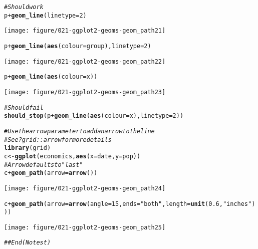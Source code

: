 \documentclass[a4paper,titlepage]{tufte-handout}\usepackage[]{graphicx}\usepackage[]{color}
\makeatletter
\def\maxwidth{ %
  \ifdim\Gin@nat@width>\linewidth
    \linewidth
  \else
    \Gin@nat@width
  \fi
}
\newcommand{\hlnum}[1]{\textcolor[rgb]{0.686,0.059,0.569}{#1}}%
\newcommand{\hlstr}[1]{\textcolor[rgb]{0.192,0.494,0.8}{#1}}%
\newcommand{\hlcom}[1]{\textcolor[rgb]{0.678,0.584,0.686}{\textit{#1}}}%
\newcommand{\hlopt}[1]{\textcolor[rgb]{0,0,0}{#1}}%
\newcommand{\hlstd}[1]{\textcolor[rgb]{0.345,0.345,0.345}{#1}}%
\newcommand{\hlkwb}[1]{\textcolor[rgb]{0.69,0.353,0.396}{#1}}%
\newcommand{\hlkwc}[1]{\textcolor[rgb]{0.333,0.667,0.333}{#1}}%
\newcommand{\hlkwd}[1]{\textcolor[rgb]{0.737,0.353,0.396}{\textbf{#1}}}%
\newenvironment{kframe}{%
 \def\at@end@of@kframe{}%
 \ifinner\ifhmode%
  \def\at@end@of@kframe{\end{minipage}}%
  \begin{minipage}{\columnwidth}%
 \fi\fi%
 \def\FrameCommand##1{\hskip\@totalleftmargin \hskip-\fboxsep
 \colorbox{shadecolor}{##1}\hskip-\fboxsep
     \hskip-\linewidth \hskip-\@totalleftmargin \hskip\columnwidth}%
 \MakeFramed {\advance\hsize-\width
   \@totalleftmargin\z@ \linewidth\hsize
   \@setminipage}}%
 {\par\unskip\endMakeFramed%
 \at@end@of@kframe}
\newenvironment{knitrout}{}{} %
\makeatother
\begin{document}
\begin{knitrout}
\begin{kframe}
\begin{alltt}
\hlcom{# Should work}
\hlstd{p} \hlopt{+} \hlkwd{geom_line}\hlstd{(}\hlkwc{linetype} \hlstd{=} \hlnum{2}\hlstd{)}
\end{alltt}
\end{kframe}
\texttt{[image: figure/021-ggplot2-geoms-geom\_path21]} 
\begin{kframe}\begin{alltt}
\hlstd{p} \hlopt{+} \hlkwd{geom_line}\hlstd{(}\hlkwd{aes}\hlstd{(}\hlkwc{colour} \hlstd{= group),} \hlkwc{linetype} \hlstd{=} \hlnum{2}\hlstd{)}
\end{alltt}
\end{kframe}
\texttt{[image: figure/021-ggplot2-geoms-geom\_path22]} 
\begin{kframe}\begin{alltt}
\hlstd{p} \hlopt{+} \hlkwd{geom_line}\hlstd{(}\hlkwd{aes}\hlstd{(}\hlkwc{colour} \hlstd{= x))}
\end{alltt}
\end{kframe}
\texttt{[image: figure/021-ggplot2-geoms-geom\_path23]} 
\begin{kframe}\begin{alltt}
\hlcom{# Should fail}
\hlkwd{should_stop}\hlstd{(p} \hlopt{+} \hlkwd{geom_line}\hlstd{(}\hlkwd{aes}\hlstd{(}\hlkwc{colour} \hlstd{= x),} \hlkwc{linetype}\hlstd{=}\hlnum{2}\hlstd{))}

\hlcom{# Use the arrow parameter to add an arrow to the line}
\hlcom{# See ?grid::arrow for more details}
\hlkwd{library}\hlstd{(grid)}
\hlstd{c} \hlkwb{<-} \hlkwd{ggplot}\hlstd{(economics,} \hlkwd{aes}\hlstd{(}\hlkwc{x} \hlstd{= date,} \hlkwc{y} \hlstd{= pop))}
\hlcom{# Arrow defaults to "last"}
\hlstd{c} \hlopt{+} \hlkwd{geom_path}\hlstd{(}\hlkwc{arrow} \hlstd{=} \hlkwd{arrow}\hlstd{())}
\end{alltt}
\end{kframe}
\texttt{[image: figure/021-ggplot2-geoms-geom\_path24]} 
\begin{kframe}\begin{alltt}
\hlstd{c} \hlopt{+} \hlkwd{geom_path}\hlstd{(}\hlkwc{arrow} \hlstd{=} \hlkwd{arrow}\hlstd{(}\hlkwc{angle} \hlstd{=} \hlnum{15}\hlstd{,} \hlkwc{ends} \hlstd{=} \hlstr{"both"}\hlstd{,} \hlkwc{length} \hlstd{=} \hlkwd{unit}\hlstd{(}\hlnum{0.6}\hlstd{,} \hlstr{"inches"}\hlstd{)))}
\end{alltt}
\end{kframe}
\texttt{[image: figure/021-ggplot2-geoms-geom\_path25]} 
\begin{kframe}\begin{alltt}
\hlcom{## End(No test)}
\end{alltt}
\end{kframe}
\end{knitrout}
\end{document}
